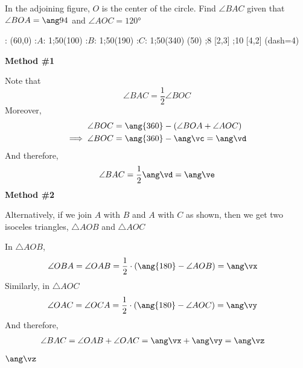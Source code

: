 

\ADD\va\vb\vc 
{}\vc\vd
\DIVIDE{}\ve
\EXPR[0]
\EXPR[0]
\ADD\vx\vy\vz

\question[3]  In the adjoining figure, $O$ is the center of the circle. Find $\angle BAC$
given that $\angle BOA = \ang\va$ and $\angle AOC = \ang{120}$

\watchout

  : (60,0)
  :$A$: 1;50(100)
  :$B$: 1;50(190)
  :$C$: 1;50(340)
\figdrawbegin{}
(50)
  \figdrawline [1,2]
  \figdrawline [1,3]
  \figdrawline [1,4]
  ;8 [2,3]
  ;10 [4,2]
  \ifprintanswers
    \figset (dash=4)
    \figdrawline [3,2,4]
  \fi
\figdrawend
{}

\vspace{1cm}
\centerline{\box\figBoxA}

\begin{solution}[\halfpage]
  \textbf{Method \#1}

  Note that 
  \[ \angle BAC = \dfrac{1}{2}\angle BOC \]
  Moreover, 
  \begin{align}
     \angle BOC &= \ang{360} - (\angle BOA + \angle AOC) \\
     \implies \angle BOC &= \ang{360}-\ang\vc = \ang\vd 
  \end{align}
  And therefore, 
  \[ \angle BAC = \dfrac{1}{2}\ang\vd = \ang\ve \]
  \textbf{Method \#2}

	Alternatively, if we join $A$ with $B$ and $A$ with $C$ as shown, then we get two isoceles 
	triangles, $\triangle AOB$ and $\triangle AOC$
	
	In $\triangle AOB$,
	\begin{align}
		\angle OBA = \angle OAB &= \dfrac{1}{2}\cdot(\ang{180}-\angle AOB) = \ang\vx
	\end{align}
	Similarly, in $\triangle AOC$
	\begin{align}
		\angle OAC = \angle OCA &= \dfrac{1}{2}\cdot(\ang{180}-\angle AOC) = \ang\vy
	\end{align}
	And therefore,
	\begin{align}
		\angle BAC &= \angle OAB + \angle OAC = \ang\vx + \ang\vy = \ang\vz
	\end{align}
\end{solution}

\ifprintanswers\begin{codex}$\ang\vz$\end{codex}\fi
